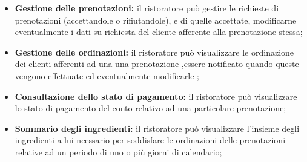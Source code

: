 \begin{itemize}
    \item \textbf{Gestione delle prenotazioni:} il ristoratore può gestire le richieste di prenotazioni (accettandole o rifiutandole), e 
    di quelle accettate, modificarne eventualmente i dati su richiesta del cliente afferente alla prenotazione stessa;
    \item \textbf{Gestione delle ordinazioni:} il ristoratore può visualizzare le ordinazione dei clienti afferenti ad una
    una prenotazione ,essere notificato quando queste vengono effettuate ed eventualmente modificarle ;
    \item \textbf{Consultazione dello stato di pagamento:} il ristoratore può visualizzare lo stato di pagamento del conto relativo ad una
    particolare prenotazione;
    \item \textbf{Sommario degli ingredienti:} il ristoratore può visualizzare l'insieme degli ingredienti a lui ncessario per soddisfare 
    le ordinazioni delle prenotazioni  relative ad un periodo di uno o più giorni di calendario;
\end{itemize}